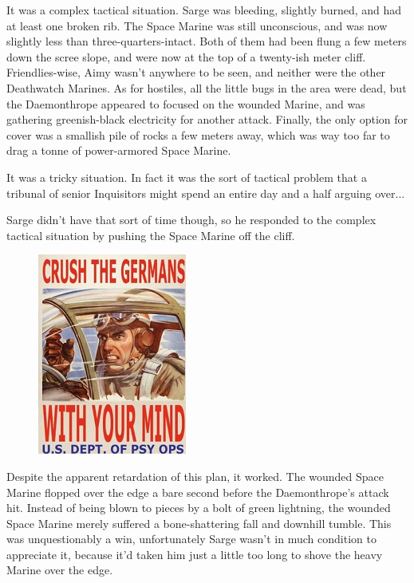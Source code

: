 It was a complex tactical situation. 
Sarge was bleeding, slightly burned, and had at least one broken rib. 
The Space Marine was still unconscious, and was now slightly less than three-quarters-intact. 
Both of them had been flung a few meters down the scree slope, and were now at the top of a twenty-ish meter cliff. 
Friendlies-wise, Aimy wasn't anywhere to be seen, and neither were the other Deathwatch Marines. 
As for hostiles, all the little bugs in the area were dead, but the Daemonthrope appeared to focused on the wounded Marine, and was gathering greenish-black electricity for another attack. 
Finally, the only option for cover was a smallish pile of rocks a few meters away, which was way too far to drag a tonne of power-armored Space Marine.

It was a tricky situation. 
In fact it was the sort of tactical problem that a tribunal of senior Inquisitors might spend an entire day and a half arguing over...

Sarge didn't have that sort of time though, so he responded to the complex tactical situation by pushing the Space Marine off the cliff.

\begin{figure}
	\begin{center}
		\includegraphics[width=\figwidth]{pics/16/51.png}
	\end{center}
\end{figure}
Despite the apparent retardation of this plan, it worked. 
The wounded Space Marine flopped over the edge a bare second before the Daemonthrope's attack hit. 
Instead of being blown to pieces by a bolt of green lightning, the wounded Space Marine merely suffered a bone-shattering fall and downhill tumble. 
This was unquestionably a win, unfortunately Sarge wasn't in much condition to appreciate it, because it'd taken him just a little too long to shove the heavy Marine over the edge.

